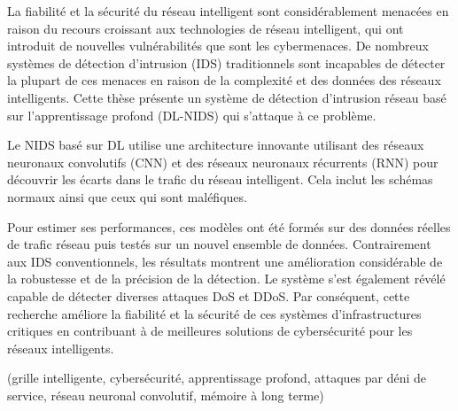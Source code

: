 %	
%	
%




\begin{abstractFr}


La fiabilité et la sécurité du réseau intelligent sont considérablement menacées en raison du recours croissant aux technologies de réseau intelligent, qui ont introduit de nouvelles vulnérabilités que sont les cybermenaces. De nombreux systèmes de détection d'intrusion (IDS) traditionnels sont incapables de détecter la plupart de ces menaces en raison de la complexité et des données des réseaux intelligents. Cette thèse présente un système de détection d'intrusion réseau basé sur l'apprentissage profond (DL-NIDS) qui s'attaque à ce problème.

  Le NIDS basé sur DL utilise une architecture innovante utilisant des réseaux neuronaux convolutifs (CNN) et des réseaux neuronaux récurrents (RNN) pour découvrir les écarts dans le trafic du réseau intelligent. Cela inclut les schémas normaux ainsi que ceux qui sont maléfiques.

  Pour estimer ses performances, ces modèles ont été formés sur des données réelles de trafic réseau puis testés sur un nouvel ensemble de données. Contrairement aux IDS conventionnels, les résultats montrent une amélioration considérable de la robustesse et de la précision de la détection. Le système s’est également révélé capable de détecter diverses attaques DoS et DDoS. Par conséquent, cette recherche améliore la fiabilité et la sécurité de ces systèmes d’infrastructures critiques en contribuant à de meilleures solutions de cybersécurité pour les réseaux intelligents.


  \end{abstractFr}



  \begin{keywordsEn}
	(grille intelligente, cybersécurité, apprentissage profond, attaques par déni de service, réseau neuronal convolutif, mémoire à long terme)
\end{keywordsEn}

\newpage
